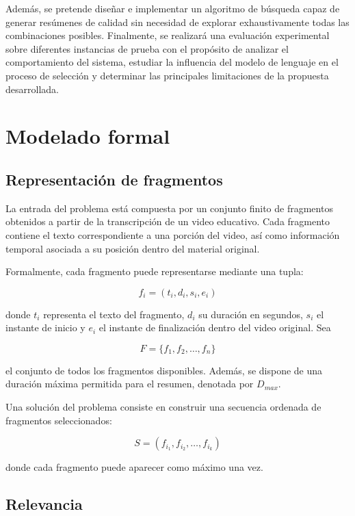 \documentclass[12pt,a4paper]{article}
\begin{document}
Además, se pretende diseñar e implementar un algoritmo de búsqueda capaz de generar resúmenes de calidad sin necesidad de explorar exhaustivamente todas las combinaciones posibles. Finalmente, se realizará una evaluación experimental sobre diferentes instancias de prueba con el propósito de analizar el comportamiento del sistema, estudiar la influencia del modelo de lenguaje en el proceso de selección y determinar las principales limitaciones de la propuesta desarrollada.


\section{Modelado formal}

\subsection{Representación de fragmentos}

La entrada del problema está compuesta por un conjunto finito de fragmentos obtenidos a partir de la transcripción de un video educativo. Cada fragmento contiene el texto correspondiente a una porción del video, así como información temporal asociada a su posición dentro del material original.

Formalmente, cada fragmento puede representarse mediante una tupla:

\[
f_i = (t_i, d_i, s_i, e_i)
\]

donde $t_i$ representa el texto del fragmento, $d_i$ su duración en segundos, $s_i$ el instante de inicio y $e_i$ el instante de finalización dentro del video original.
Sea

\[
F = \{f_1, f_2, \ldots, f_n\}
\]

el conjunto de todos los fragmentos disponibles. Además, se dispone de una duración máxima permitida para el resumen, denotada por $D_{max}$.

Una solución del problema consiste en construir una secuencia ordenada de fragmentos seleccionados:

\[
S=(f_{i_1},f_{i_2},\ldots,f_{i_k})
\]

donde cada fragmento puede aparecer como máximo una vez.

\subsection{Relevancia}
\end{document}
